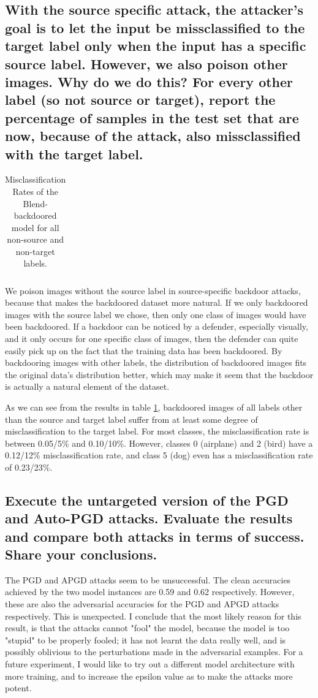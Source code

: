 \documentclass{article}
\begin{document}
\subsection{With the source specific attack, the attacker’s goal is to let the input
be missclassified to the target label only when the input has a specific source
label. However, we also poison other images. Why do we do this? For every
other label (so not source or target), report the percentage of samples in the test
set that are now, because of the attack, also missclassified with the target label.}
\begin{table}
    \centering
    \begin{tabular}{c|c|c|c|c|c|c|c}
        
    \end{tabular}
    \caption{Misclassification Rates of the Blend-backdoored model for all non-source and non-target labels.}
    \label{tab:misclassification_rates}
\end{table}

We poison images without the source label in source-specific backdoor attacks, because that makes the backdoored dataset more natural. 
If we only backdoored images with the source label we chose, then only one class of images would have been backdoored. 
If a backdoor can be noticed by a defender, especially visually, and it only occurs for one specific class of images, then the defender can quite easily pick up on the fact that the training data has been backdoored. 
By backdooring images with other labels, the distribution of backdoored images fits the original data's distribution better, which may make it seem that the backdoor is actually a natural element of the dataset.

As we can see from the results in table \ref{tab:misclassification_rates}, backdoored images of all labels other than the source and target label suffer from at least some degree of misclassification to the target label. 
For most classes, the misclassification rate is between 0.05/5\% and 0.10/10\%. 
However, classes 0 (airplane) and 2 (bird) have a 0.12/12\% misclassification rate, and class 5 (dog) even has a misclassification rate of 0.23/23\%. 

\subsection{Execute the untargeted version of the PGD and Auto-PGD attacks.
Evaluate the results and compare both attacks in terms of success. Share your
conclusions.}
The PGD and APGD attacks seem to be unsuccessful.
The clean accuracies achieved by the two model instances are 0.59 and 0.62 respectively.
However, these are also the adversarial accuracies for the PGD and APGD attacks respectively.
This is unexpected.
I conclude that the most likely reason for this result, is that the attacks cannot "fool" the model, because the model is too "stupid" to be properly fooled; it has not learnt the data really well, and is possibly oblivious to the perturbations made in the adversarial examples.
For a future experiment, I would like to try out a different model architecture with more training, and to increase the epsilon value as to make the attacks more potent.
\end{document}
